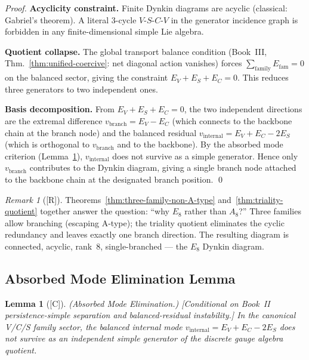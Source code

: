 \documentclass[12pt,oneside]{amsbook}
\theoremstyle{plain}
\newtheorem{lemma}[theorem]{Lemma}
\theoremstyle{definition}
\theoremstyle{remark}
\newtheorem{remark}[theorem]{Remark}
\newcommand{\status}[1]{\textup{[#1]}}
\begin{document}
\begin{proof}
\textbf{Acyclicity constraint.} Finite Dynkin diagrams are acyclic
(classical: Gabriel's theorem). A literal 3-cycle $V$-$S$-$C$-$V$
in the generator incidence graph is forbidden in any finite-dimensional
simple Lie algebra.

\textbf{Quotient collapse.} The global transport balance condition
(Book~III, Thm.~\ref{thm:unified-coercive}: net diagonal action vanishes)
forces $\sum_{\mathrm{family}} E_{\mathrm{fam}} = 0$ on the
balanced sector, giving the constraint $E_V + E_S + E_C = 0$.
This reduces three generators to two independent ones.

\textbf{Basis decomposition.} From $E_V + E_S + E_C = 0$, the two
independent directions are the extremal difference $v_{\mathrm{branch}}
= E_V - E_C$ (which connects to the backbone chain at the branch
node) and the balanced residual $v_{\mathrm{internal}} = E_V + E_C
- 2E_S$ (which is orthogonal to $v_{\mathrm{branch}}$ and to the
backbone). By the absorbed mode criterion
(Lemma~\ref{lem:absorbed-mode-elimination}), $v_{\mathrm{internal}}$
does not survive as a simple generator. Hence only $v_{\mathrm{branch}}$
contributes to the Dynkin diagram, giving a single branch node
attached to the backbone chain at the designated branch position. \qed
\end{proof}

\begin{remark}[\status{R}]
Theorems~\ref{thm:three-family-non-A-type} and~\ref{thm:triality-quotient}
together answer the question: ``why $E_8$ rather than $A_8$?''
Three families allow branching (escaping A-type); the triality quotient
eliminates the cyclic redundancy and leaves exactly one branch
direction. The resulting diagram is connected, acyclic, rank~8,
single-branched --- the $E_8$ Dynkin diagram.
\end{remark}

\subsection{Absorbed Mode Elimination Lemma}

\begin{lemma}[\status{C}]\label{lem:absorbed-mode-elimination}
\textup{(Absorbed Mode Elimination.)}
\textup{[Conditional on Book~II persistence-simple separation and
balanced-residual instability.]}
In the canonical V/C/S family sector, the balanced internal mode
$v_{\mathrm{internal}} = E_V + E_C - 2E_S$ does not survive as an
independent simple generator of the discrete gauge algebra quotient.
\end{lemma}
\end{document}
